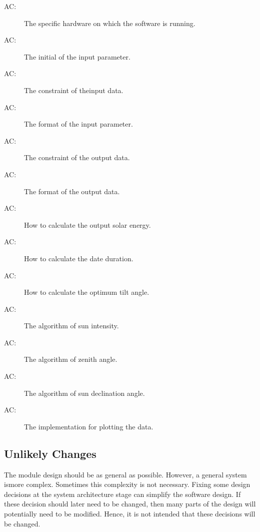 \documentclass[12pt, titlepage]{article}
\newcounter{acnum}
\newcommand{\actheacnum}{AC\theacnum}
\begin{document}
\begin{description}
\item[ \actheacnum \label{acHardware}:] The specific
  hardware on which the software is running.
\item[ \actheacnum \label{acInput}:] The initial of the
  input parameter.
\item[ \actheacnum \label{acInput}:] The constraint of theinput data.
\item[ \actheacnum \label{acInput}:] The format of the
  input parameter.
\item[ \actheacnum \label{acOutput}:] The constraint of
the output data.
\item[ \actheacnum \label{acOutput}:] The format of the
  output data.
\item[ \actheacnum \label{acSolarEnergy}:] How to
calculate the output solar energy.
\item[ \actheacnum \label{acDateDuration}:]  How to
calculate the date duration.
\item[ \actheacnum \label{acTiltAngle}:] How to calculate
the optimum tilt angle.
\item[ \actheacnum \label{acSunIntensity}:] The algorithm
of sun intensity.
\item[ \actheacnum \label{acZenithAngle}:] The algorithm
of zenith angle.
\item[ \actheacnum \label{acSunDeclination}:] The
algorithm of sun declination angle.
\item[ \actheacnum \label{acPlot}:]  The
implementation for plotting the data.

\end{description}

\subsection{Unlikely Changes} \label{SecUchange}

The module design should be as general as possible. However, a general system
ismore complex. Sometimes this complexity is not necessary. Fixing some design
decisions at the system architecture stage can simplify the software design. If
these decision should later need to be changed, then many parts of the design
will potentially need to be modified. Hence, it is not intended that these
decisions will be changed.
\end{document}
